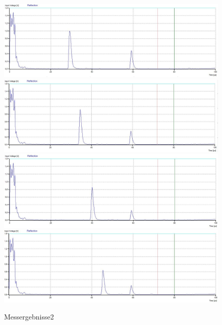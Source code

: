 \begin{figure}[H]
\centering
\includegraphics[width=\textwidth]{messungen/quader/bild5.jpg}
\includegraphics[width=\textwidth]{messungen/quader/bild6.jpg}
\includegraphics[width=\textwidth]{messungen/quader/bild7.jpg}
\includegraphics[width=\textwidth]{messungen/quader/bild8.jpg}
\caption{Messergebnisse2}	
\end{figure}

